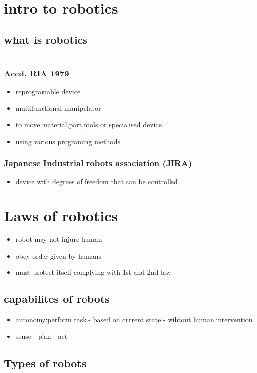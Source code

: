 \documentclass{article}
\begin{document}
\section{intro to robotics}
\subsection{what is robotics}
\par\noindent\rule{\textwidth}{0.4pt}
\subsubsection{Accd. RIA 1979}
\begin{itemize}
	\item reprogramable device
	\item multifunctional manipulator
	\item to move material,part,tools or specialised device
	\item using various programing methods
\end{itemize}
\subsubsection{Japanese Industrial robots association (JIRA)}
\begin{itemize}
	\item device with degrees of freedom that can be controlled
\end{itemize}
\section{Laws of robotics}
\begin{itemize}
	\item robot may not injure human
	\item obey order given by humans
	\item must protect itself complying with 1st and 2nd law
\end{itemize}
\subsection{capabilites of robots}
\begin{itemize}
	\item autonomy:perform task - based on current state - wihtout human intervention
	\item sense - plan - act
\end{itemize}
\subsection{Types of robots }
\end{document}
